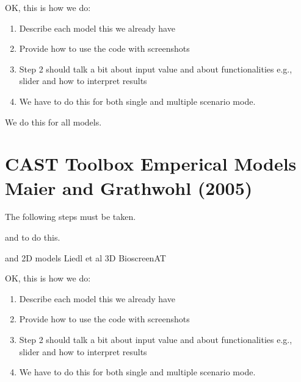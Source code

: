 \documentclass[letterpaper,10pt,english]{sphinxmanual}
\begin{document}
\sphinxAtStartPar
OK, this is how we do:
\begin{enumerate}
%
\item {} 
\sphinxAtStartPar
Describe each model \sphinxhyphen{} this we already have

\item {} 
\sphinxAtStartPar
Provide how to use the code with screenshots

\item {} 
\sphinxAtStartPar
Step 2 should talk a bit about input value and about functionalities \sphinxhyphen{} e.g., slider and how to interpret results

\item {} 
\sphinxAtStartPar
We have to do this for both single and multiple scenario mode.

\end{enumerate}

\sphinxAtStartPar
We do this for all models.


\section{CAST Toolbox \sphinxhyphen{} Emperical Models \sphinxhyphen{} Maier and Grathwohl (2005)}
\label{\detokenize{contents/toolbox/em_model/mg2005:cast-toolbox-emperical-models-maier-and-grathwohl-2005}}\label{\detokenize{contents/toolbox/em_model/mg2005::doc}}
\sphinxAtStartPar
The following steps must be taken.

\sphinxAtStartPar
{} and  to do this.

\sphinxAtStartPar
{} and  \sphinxhyphen{} 2D models
 Liedl et al 3D
 Bioscreen\sphinxhyphen{}AT

\sphinxAtStartPar
OK, this is how we do:
\begin{enumerate}
%
\item {} 
\sphinxAtStartPar
Describe each model \sphinxhyphen{} this we already have

\item {} 
\sphinxAtStartPar
Provide how to use the code with screenshots

\item {} 
\sphinxAtStartPar
Step 2 should talk a bit about input value and about functionalities \sphinxhyphen{} e.g., slider and how to interpret results

\item {} 
\sphinxAtStartPar
We have to do this for both single and multiple scenario mode.

\end{enumerate}
\end{document}
